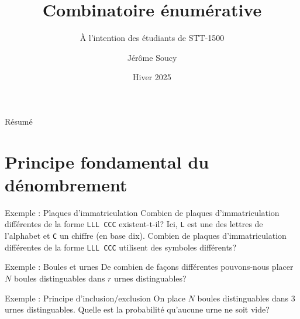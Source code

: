 \documentclass[nuit,charter,pied]{BeamerJS}
\title{Combinatoire énumérative}
\subtitle{À l'intention des étudiants de STT-1500}
\institute{Université Laval}
\author{Jérôme Soucy}
\date{Hiver 2025}
\begin{document}
\begin{frame}
	\titlepage
\end{frame}
\begin{frame}{Résumé}
\tableofcontents
\end{frame}	
\section{Principe fondamental du dénombrement }
\begin{frame}{Exemple : Plaques d'immatriculation}
	Combien de plaques d'immatriculation différentes de la forme \texttt{LLL CCC} existent-t-il? Ici, \texttt{L} est une des lettres de l'alphabet et \texttt{C} un chiffre (en base dix).
	\vfill
	\pause
	Combien de plaques d'immatriculation différentes de la forme \texttt{LLL CCC} utilisent des symboles différents?
	\vfill
\end{frame}

\begin{frame}{Exemple : Boules et urnes}
	De combien de façons différentes pouvons-nous placer $N$ boules distinguables dans $r$ urnes distinguables?
\end{frame}

\begin{frame}{Exemple : Principe d'inclusion/exclusion}
	On place $N$ boules distinguables dans $3$ urnes distinguables. Quelle est la probabilité qu'aucune urne ne soit vide?
\end{frame}
\end{document}
